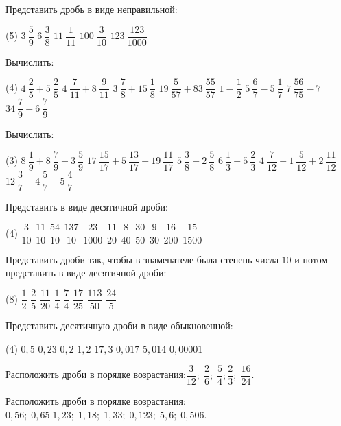 \begin{class}[number=6]
	\begin{listofex}
	\item Представить дробь в виде неправильной:
	\begin{tasks}(5)
		\task \( 3\:\dfrac{5}{9} \)
		\task \( 6\:\dfrac{3}{8} \)
		\task \( 11\:\dfrac{1}{11} \)
		\task \( 100\:\dfrac{3}{10} \)
		\task \( 123\:\dfrac{123}{1000} \)
	\end{tasks}
	\item Вычислить:
	\begin{tasks}(4)
		\task \( 4\:\dfrac{2}{5}+5\:\dfrac{2}{5} \)
		\task \( 4\:\dfrac{7}{11}+8\:\dfrac{9}{11} \)
		\task \( 3\:\dfrac{7}{8}+15\:\dfrac{1}{8} \)
		\task \( 19\:\dfrac{5}{57}+83\:\dfrac{55}{57} \)
		\task \( 1-\dfrac{1}{2} \)
		\task \( 5\:\dfrac{6}{7}-5\:\dfrac{1}{7} \)
		\task \( 7\:\dfrac{56}{75}-7 \)
		\task \( 34\:\dfrac{7}{9}-6\:\dfrac{7}{9} \)
	\end{tasks}
	\item Вычислить:
	\begin{tasks}(3)
		\task \( 8\:\dfrac{1}{9}+8\:\dfrac{7}{9}-3\:\dfrac{5}{9} \)
		\task \( 17\:\dfrac{15}{17}+5\:\dfrac{13}{17}+19\:\dfrac{11}{17} \)
		\task \( 5\:\dfrac{3}{8}-2\:\dfrac{5}{8} \)
		\task \( 6\:\dfrac{1}{3}-5\:\dfrac{2}{3} \)
		\task \( 4\:\dfrac{7}{12}-1\:\dfrac{5}{12}+2\:\dfrac{11}{12} \)
		\task \( 12\:\dfrac{3}{7}-4\:\dfrac{5}{7}-5\:\dfrac{4}{7} \)
	\end{tasks}
	\item Представить в виде десятичной дроби:
	\begin{tasks}(4)
		\task\( \dfrac{3}{10} \)
		\task \( \dfrac{11}{10} \)
		\task \( \dfrac{54}{10} \)
		\task \( \dfrac{137}{10} \)
		\task \( \dfrac{23}{1000} \)
		\task \( \dfrac{11}{20} \)
		\task \( \dfrac{8}{40} \)
		\task \( \dfrac{30}{50} \)
		\task \( \dfrac{9}{30} \)
		\task \( \dfrac{16}{200} \)
		\task \( \dfrac{15}{1500} \)
	\end{tasks}
	\item Представить дроби так, чтобы в знаменателе была степень числа \( 10 \) и потом представить в виде десятичной дроби:
	\begin{tasks}(8)
		\task \( \dfrac{1}{2} \)
		\task \( \dfrac{2}{5} \)
		\task \( \dfrac{11}{20} \)
		\task \( \dfrac{1}{4} \)
		\task \( \dfrac{7}{4} \)
		\task \( \dfrac{17}{25} \)
		\task \( \dfrac{113}{50} \)
		\task \( \dfrac{24}{5} \)
	\end{tasks}
	\item Представить десятичную дроби в виде обыкновенной:
	\begin{tasks}(4)
		\task \( 0,5 \)
		\task \( 0,23 \)
		\task \( 0,2 \)
		\task \( 1,2 \)
		\task \( 17,3 \)
		\task \( 0,017 \)
		\task \( 5,014 \)
		\task \( 0,00001 \)
	\end{tasks}
	\item Расположить дроби в порядке возрастания:\( \dfrac{3}{12};\;\dfrac{2}{6};\;\dfrac{5}{4};\dfrac{2}{3};\;\dfrac{16}{24} \).
	\item Расположить дроби в порядке возрастания:\( 0,56;\;0,65\;1,23;\;1,18;\;1,33;\;0,123;\;5,6;\;0,506 \).
	\end{listofex}
\end{class}

